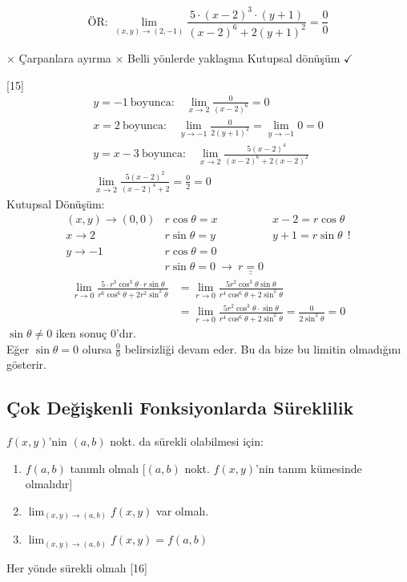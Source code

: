 \documentclass[11pt,a4paper]{article}
\begin{document}
\[ \text{ÖR: }\lim_{(x,y)\to(2,-1)}\frac{5\cdot(x-2)^3\cdot(y+1)}{(x-2)^6+2(y+1)^2}=\frac00 \]
\begin{center}
$\times$ Çarpanlara ayırma \qquad $\times$ Belli yönlerde yaklaşma \qquad Kutupsal dönüşüm $\checkmark$
\end{center}
[15]
\begin{gather*}
y=-1\ \text{boyunca:}\quad\lim_{x\to2}\frac{0}{(x-2)^6}=0\\
x=2\ \text{boyunca:}\quad\lim_{y\to-1}\frac{0}{2(y+1)^2}=\lim_{y\to-1}0=0\\
y=x-3\ \text{boyunca:}\quad\lim_{x\to2}\frac{5(x-2)^4}{(x-2)^6+2(x-2)^2}\\
\lim_{x\to2}\frac{5(x-2)^2}{(x-2)^4+2}=\frac02=0
\end{gather*}
Kutupsal Dönüşüm:
\[ \begin{array}{lll}(x,y)\to(0,0)&r\cos\theta=x&x-2=r\cos\theta\\ x\to2&r\sin\theta=y&y+1=r\sin\theta\ \ !\\ y\to-1&r\cos\theta=0&\\ &r\sin\theta=0\ \to\ \underline{\underline{r=0}}&\end{array} \]
\begin{align*}
\lim_{r\to0}\frac{5\cdot r^3\cos^3\theta\cdot r\sin\theta}{r^6\cos^6\theta+2r^2\sin^2\theta}&=\lim_{r\to0}\frac{5r^2\cos^3\theta\sin\theta}{r^4\cos^6\theta+2\sin^2\theta}\\
&=\lim_{r\to0}\frac{5r^2\cos^3\theta\cdot\sin\theta}{r^4\cos^6\theta+2\sin^2\theta}=\frac{0}{2\sin^2\theta}=0
\end{align*}
$\sin\theta\neq0$ iken sonuç 0'dır.\\
Eğer $\sin\theta=0$ olursa $\frac00$ belirsizliği devam eder. Bu da bize bu limitin olmadığını gösterir.

\subsection{Çok Değişkenli Fonksiyonlarda Süreklilik}
$f(x,y)$'nin $(a,b)$ nokt. da sürekli olabilmesi için:
\begin{enumerate}[label=(\arabic*),nosep]
\item $f(a,b)$ tanımlı olmalı [$(a,b)$ nokt. $f(x,y)$'nin tanım kümesinde olmalıdır]
\item $\displaystyle\lim_{(x,y)\to(a,b)}f(x,y)$ var olmalı.
\item $\displaystyle\lim_{(x,y)\to(a,b)}f(x,y)=f(a,b)$
\end{enumerate}
Her yönde sürekli olmalı
[16]
\end{document}
